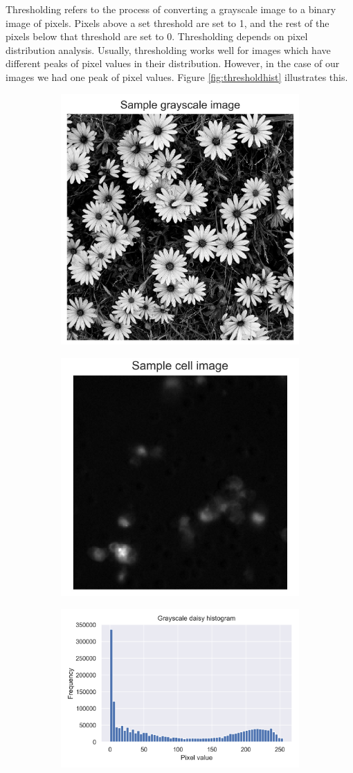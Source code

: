 Thresholding refers to the process of converting a grayscale image to a binary image of pixels. Pixels above a set threshold are set to 1, and the rest of the pixels below that threshold are set to 0. Thresholding depends on pixel distribution analysis. Usually, thresholding works well for images which have different peaks of pixel values in their distribution. However, in the case of our images we had one peak of pixel values. Figure \ref{fig:thresholdhist} illustrates this.

\begin{figure}[h]
    \centering
    \begin{subfigure}{0.45\textwidth}
        \centering
        \includegraphics[width=.5\textwidth]{dissertation/figures/sample_grayscale.jpg}
    \end{subfigure}
    \begin{subfigure}{0.45\textwidth}
        \centering
        \includegraphics[width=.5\textwidth]{dissertation/figures/sample_cell.jpg}
    \end{subfigure}
    \begin{subfigure}{0.45\textwidth}
        \centering
        \includegraphics[width=.5\textwidth]{dissertation/figures/grayscale_histogram.png}

\end{subfigure}
\end{figure}
